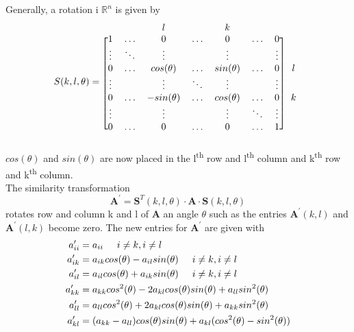 \documentclass[%
oneside,                 %
final,                   %
10pt]{article}
\newcommand{\R}{\mathbb{R}}
\begin{document}
Generally, a rotation i $\R^n$ is given by 
\[
S(k,l,\theta) = \begin{blockarray}{cccccccc}
 		&  				& l				&			&k 				& 			&  \\
\begin{block}{[ccccccc] c}
  1 	& \ldots 		&  0			&  \ldots	&  0			& \ldots	& 0 	&	 \\
  \vdots & \ddots 		& 	\vdots		& 	 		& 	\vdots		& 			& \vdots &  	 \\
  	0	& 	\ldots		& cos(\theta) 	& \ldots 	& sin(\theta)	& 	\ldots	& 0		& l	 \\
  \vdots&  				& \vdots 		& \ddots 	& \vdots		& 			&\vdots&	 \\
    0	& 	 \ldots		& -sin(\theta)	& \ldots	& cos(\theta) 	& 	\ldots	&	0	& k	\\
  \vdots &  			& \vdots		& 			& 	\vdots		& \ddots	& \vdots & 	\\
  0 & \ldots			& 0	 			& \ldots	& 0				& \ldots	& 1 &  	\\
\end{block}
\end{blockarray}
 \]
$cos(\theta)$ and $sin(\theta)$ are now placed in the l\textsuperscript{th} row and l\textsuperscript{th} column and k\textsuperscript{th} row and k\textsuperscript{th} column. \\
The similarity transformation 
\begin{equation}
\mathbf{A}^\prime = \mathbf{S}^T(k,l,\theta) \cdot \mathbf{A} \cdot \mathbf{S}(k,l,\theta)
\end{equation}
rotates row and column k and l of $\mathbf{A}$ an angle $\theta$ such as the entries $\mathbf{A}^\prime (k,l)$ and $ \mathbf{A}^\prime(l,k)$ become zero.
The new entries for $\mathbf{A}^\prime$ are given with
\begin{equation}
\begin{split}
a_{ii}^\prime &= a_{ii} \hspace{0.5cm} i \neq k, i \neq l \\
a_{ik}^\prime &= a_{ik}cos(\theta) - a_{il}sin(\theta) \hspace{0.5cm} i \neq k, i \neq l \\
a_{il}^\prime &= a_{il}cos(\theta) + a_{ik}sin(\theta) \hspace{0.5cm} i \neq k, i \neq l\\
a_{kk}^\prime &= a_{kk}cos^2(\theta) -2a_{kl}cos(\theta)sin(\theta) + a_{ll}sin^2(\theta)\\
a_{ll}^\prime &= a_{ll}cos^2(\theta) + 2a_{kl}cos(\theta)sin(\theta) + a_{kk}sin^2(\theta)\\
a_{kl}^\prime &= (a_{kk}-a_{ll})cos(\theta)sin(\theta) + a_{kl}(cos^2(\theta)-sin^2(\theta))
\end{split}
\end{equation}
\end{document}
